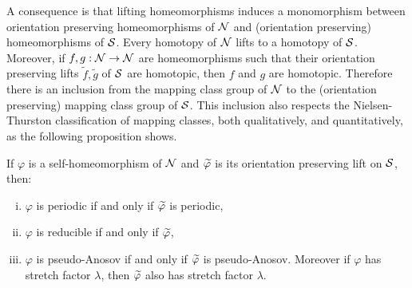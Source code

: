 A consequence is that lifting homeomorphisms induces a monomorphism between orientation preserving homeomorphisms of $\mathcal{N}$ and (orientation preserving) homeomorphisms of $\mathcal{S}$.  Every homotopy of $\mathcal{N}$ lifts to a homotopy of $\mathcal{S}$.  Moreover, if $f,g:\mathcal{N}\to\mathcal{N}$ are homeomorphisms such that their orientation preserving lifts $\widetilde{f},\widetilde{g}$ of $\mathcal{S}$ are homotopic, then $f$ and $g$ are homotopic.  Therefore there is an inclusion from the mapping class group of $\mathcal{N}$ to the (orientation preserving) mapping class group of $\mathcal{S}$.  This inclusion also respects the Nielsen-Thurston classification of mapping classes, both qualitatively, and
quantitatively, as the following proposition shows.
\begin{prop}
  \label{prop:2}
  If $\varphi$ is a self-homeomorphism of $\mathcal{N}$ and $\widetilde{\varphi}$ is its orientation preserving lift on $\mathcal{S}$, then:
  \begin{enumerate}[(i)]
  \item $\varphi$ is periodic if and only if $\widetilde{\varphi}$ is periodic,
  \item $\varphi$ is reducible if and only if $\widetilde{\varphi}$,
  \item $\varphi$ is pseudo-Anosov if and only if $\widetilde{\varphi}$ is pseudo-Anosov.  Moreover if $\varphi$ has stretch factor $\lambda$, then $\widetilde{\varphi}$ also has stretch factor $\lambda$.
  \end{enumerate}
\end{prop}
